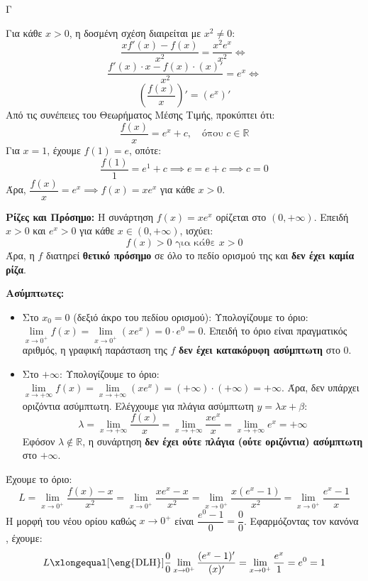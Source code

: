 \begin{thema}{Γ}
\begin{erwthma}
\item Για κάθε $x > 0$, η δοσμένη σχέση διαιρείται με $x^2 \neq 0$:
\[ \frac{x f'(x) - f(x)}{x^2} = \frac{x^2 e^x}{x^2}\Leftrightarrow \]
\[ \frac{f'(x) \cdot x - f(x) \cdot (x)'}{x^2} = e^x\Leftrightarrow \]
\[ \left( \frac{f(x)}{x} \right)' = (e^x)' \]
Από τις συνέπειες του Θεωρήματος Μέσης Τιμής, προκύπτει ότι:
\[ \frac{f(x)}{x} = e^x + c, \quad \text{όπου } c \in \mathbb{R} \]
Για $x = 1$, έχουμε $f(1) = e$, οπότε:
\[ \frac{f(1)}{1} = e^1 + c \implies e = e + c \implies c = 0 \]
Άρα, $\dfrac{f(x)}{x} = e^x \implies f(x) = x e^x$ για κάθε $x > 0$.

\item \textbf{Ρίζες και Πρόσημο:}
Η συνάρτηση $f(x) = x e^x$ ορίζεται στο $(0, +\infty)$. 
Επειδή $x > 0$ και $e^x > 0$ για κάθε $x \in (0, +\infty)$, ισχύει:
\[ f(x) > 0 \text{ για κάθε } x > 0 \]
Άρα, η $f$ διατηρεί \textbf{θετικό πρόσημο} σε όλο το πεδίο ορισμού της και \textbf{δεν έχει καμία ρίζα}.

\textbf{Ασύμπτωτες:}
\begin{itemize}
    \item Στο $x_0 = 0$ (δεξιό άκρο του πεδίου ορισμού):
    Υπολογίζουμε το όριο: $\lim\limits_{x \to 0^+} f(x) = \lim\limits_{x \to 0^+} (x e^x) = 0 \cdot e^0 = 0$.
    Επειδή το όριο είναι πραγματικός αριθμός, η γραφική παράσταση της $f$ \textbf{δεν έχει κατακόρυφη ασύμπτωτη} στο $0$.
    \item Στο $+\infty$:
    Υπολογίζουμε το όριο: $\lim\limits_{x \to +\infty} f(x) = \lim\limits_{x \to +\infty} (x e^x) = (+\infty) \cdot (+\infty) = +\infty$.
    Άρα, δεν υπάρχει οριζόντια ασύμπτωτη. 
    Ελέγχουμε για πλάγια ασύμπτωτη $y = \lambda x + \beta$:
    \[ \lambda = \lim_{x \to +\infty} \frac{f(x)}{x} = \lim_{x \to +\infty} \frac{x e^x}{x} = \lim_{x \to +\infty} e^x = +\infty \]
    Εφόσον $\lambda \notin \mathbb{R}$, η συνάρτηση \textbf{δεν έχει ούτε πλάγια (ούτε οριζόντια) ασύμπτωτη} στο $+\infty$.
\end{itemize}

\item Έχουμε το όριο:
\[ L = \lim_{x \to 0^+} \frac{f(x) - x}{x^2} = \lim_{x \to 0^+} \frac{x e^x - x}{x^2} = \lim_{x \to 0^+} \frac{x(e^x - 1)}{x^2} = \lim_{x \to 0^+} \frac{e^x - 1}{x} \]
Η μορφή του νέου ορίου καθώς $x \to 0^+$ είναι $\dfrac{e^0 - 1}{0} = \dfrac{0}{0}$.
Εφαρμόζοντας τον κανόνα , έχουμε:
\[ L \xlongequal[\text{\eng{DLH}}]{\frac{0}{0}} \lim_{x \to 0^+} \frac{(e^x - 1)'}{(x)'} = \lim_{x \to 0^+} \frac{e^x}{1} = e^0 = 1 \]


\end{erwthma}
\end{thema}
